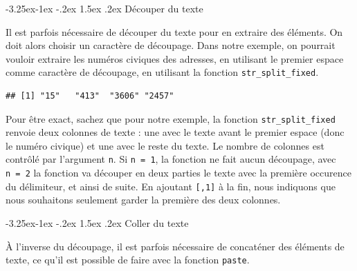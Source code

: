\documentclass[
  11pt,
  french,
]{book}
\makeatletter
\newenvironment{Shaded}{\begin{snugshade}}{\end{snugshade}}
\newcommand{\DataTypeTok}[1]{\textcolor[rgb]{0.13,0.29,0.53}{#1}}
\newcommand{\DecValTok}[1]{\textcolor[rgb]{0.00,0.00,0.81}{#1}}
\newcommand{\KeywordTok}[1]{\textcolor[rgb]{0.13,0.29,0.53}{\textbf{#1}}}
\newcommand{\NormalTok}[1]{#1}
\newcommand{\OperatorTok}[1]{\textcolor[rgb]{0.81,0.36,0.00}{\textbf{#1}}}
\newcommand{\StringTok}[1]{\textcolor[rgb]{0.31,0.60,0.02}{#1}}
\newenvironment{kframe}{%
\medskip{}
\setlength{\fboxsep}{.8em}
 \def\at@end@of@kframe{}%
 \ifinner\ifhmode%
  \def\at@end@of@kframe{\end{minipage}}%
  \begin{minipage}{\columnwidth}%
 \fi\fi%
 \def\FrameCommand##1{\hskip\@totalleftmargin \hskip-\fboxsep
 \colorbox{shadecolor}{##1}\hskip-\fboxsep
     \hskip-\linewidth \hskip-\@totalleftmargin \hskip\columnwidth}%
 \MakeFramed {\advance\hsize-\width
   \@totalleftmargin\z@ \linewidth\hsize
   \@setminipage}}%
 {\par\unskip\endMakeFramed%
 \at@end@of@kframe}
\renewenvironment{Shaded}{\begin{kframe}}{\end{kframe}}
\renewcommand\paragraph{\@startsection{paragraph}{4}{\z@}%
   {-3.25ex\@plus -1ex \@minus -.2ex}%
   {1.5ex \@plus .2ex}%
   {\normalfont\normalsize\bfseries}}
\makeatother
\begin{document}
\hypertarget{sect014253}{%
\paragraph{Découper du texte}\label{sect014253}}

Il est parfois nécessaire de découper du texte pour en extraire des éléments. On doit alors choisir un caractère de découpage. Dans notre exemple, on pourrait vouloir extraire les numéros civiques des adresses, en utilisant le premier espace comme caractère de découpage, en utilisant la fonction \texttt{str\_split\_fixed}.

\begin{Shaded}
\end{Shaded}

\begin{verbatim}
## [1] "15"   "413"  "3606" "2457"
\end{verbatim}

Pour être exact, sachez que pour notre exemple, la fonction \texttt{str\_split\_fixed} renvoie deux colonnes de texte : une avec le texte avant le premier espace (donc le numéro civique) et une avec le reste du texte. Le nombre de colonnes est contrôlé par l'argument \texttt{n}. Si \texttt{n\ =\ 1}, la fonction ne fait aucun découpage, avec \texttt{n\ =\ 2} la fonction va découper en deux parties le texte avec la première occurence du délimiteur, et ainsi de suite. En ajoutant \texttt{{[},1{]}} à la fin, nous indiquons que nous souhaitons seulement garder la première des deux colonnes.

\hypertarget{sect014254}{%
\paragraph{Coller du texte}\label{sect014254}}

À l'inverse du découpage, il est parfois nécessaire de concaténer des éléments de texte, ce qu'il est possible de faire avec la fonction \texttt{paste}.

\begin{Shaded}
\end{Shaded}
\end{document}
